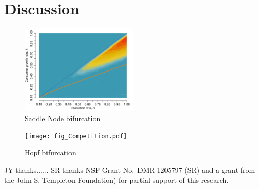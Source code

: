 \documentclass[11pt]{iopart}
\begin{document}
\section{Discussion}


\begin{figure}[h]
	\centering
	\includegraphics[width=0.5\textwidth]{fig_Hopf.pdf}
	\caption{
	Saddle Node bifurcation
	}
	\label{SN}
\end{figure}





\begin{figure}[h]
	\centering
	\texttt{[image: fig\_Competition.pdf]}
	\caption{
	Hopf bifurcation
	}
	\label{SN1}
\end{figure}

JY thanks......  SR thanks NSF Grant No.\ DMR-1205797 (SR) and a grant from
the John S. Templeton Foundation) for partial support of this research.
\end{document}
